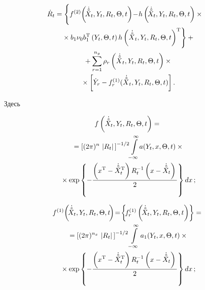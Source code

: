 \begin{multicols}{2}
    \vspace*{-12pt}
    
    \noindent
    \begin{multline}
\hspace*{-5pt}\!\dot R_t=\left\{ 
\vphantom{\left({\dot{\hat{\tilde  X}}}_t,  Y_t,R_t,\Theta,t\right)^{\mathrm{T}}}
f^{(2)}\!\left(\!\dot{\hat{\tilde  X}}_t, Y_t,R_t,\Theta,t\right)\!-\!h\left(\!\dot{\hat{\tilde  X}}_t, Y_t,R_t,\Theta,t\right)\times{}\right.\\
\left.{}\times b_1\nu_0 b_1^{\mathrm{T}} \left(Y_t,\Theta,t\right) 
 h \left({\dot{\hat{\tilde  X}}}_t, 
Y_t,R_t,\Theta,t\right)^{\mathrm{T}}\right\}+{}\\
{}+\sum\limits_{r=1}^{n_y} \rho_r \left( {\dot{\hat{\tilde  
X}}}_t,Y_t, R_t,\Theta,t\right)\times{}\\
{}\times \lk
    \dot Y_r -f_r^{(1)}({\dot{\hat{\tilde  X}}}_t,Y_t, 
R_t,\Theta,t)\rk.\label{e3.8-s}
\end{multline}

\vspace*{-4pt}

\noindent
Здесь

\vspace*{-4pt}

\noindent
\begin{multline*}
f\left(\dot{\hat{\tilde  X}}_t, Y_t,R_t,\Theta,t\right)={}\\
{}= \left[(2\pi)^n \,\left\vert     R_t\right\vert\,\right]^{-1/2}  \!\int\limits_{-\infty}^\infty\! a(Y_t,x,\Theta,t)\times{}\\
{}\times \exp \left\{ -
    \displaystyle\frac{\displaystyle \left(x^{\mathrm{T}}
    -\dot{\hat{\tilde  X}}_t^{\mathrm{T}}\right) R_t^{-1} \left(x -\dot{\hat{\tilde  X}}_t\right)\mathstrut}{\displaystyle 2\mathstrut}\right\}
    dx\,;
    \end{multline*}
    
    \vspace*{-12pt}
    
    \noindent
  \begin{multline*}
  f^{(1)}\!\left(\!\dot{\hat{\tilde  X}}_t, Y_t,R_t,\Theta,t\!\right)\!=\!\left\{\! f_r^{(1)} \left(\! 
\dot{\hat{\tilde  X}}_t, Y_t, R_t,\Theta, t\right)\right\}={}\\
    {}=\left[ (2\pi)^{n_x}\,\left\vert
    R_t\right\vert\,\right]^{-1/2}\int\limits_{-\infty}^\infty a_1(Y_t,x,\Theta,t)\times{}\\
    {}\times \exp \left\{
    -\displaystyle\frac{\displaystyle \left(x^{\mathrm{T}} -\dot{\hat{\tilde  X}}_t^{\mathrm{T}}\right) R_t^{-1} \left(x -\dot{\hat{\tilde  X}}_t\right)\mathstrut}{\displaystyle 2\mathstrut}\right\}
    dx\,;
    \end{multline*}
    

\end{multicols}
